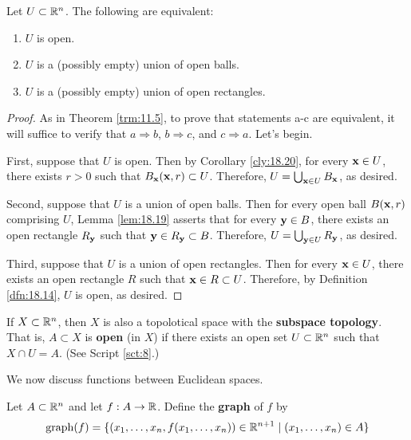 \documentclass[../main.tex]{subfiles}
\begin{document}
\begin{proposition}\label{prp:18.22}
    Let $U\subset\mathbb{R}^n$. The following are equivalent:
    \begin{enumerate}[label={\textup{(}\alph*\textup{)}}]
        \item $U$ is open.
        \item $U$ is a (possibly empty) union of open balls.
        \item $U$ is a (possibly empty) union of open rectangles.
    \end{enumerate}
    \begin{proof}
        As in Theorem \ref{trm:11.5}, to prove that statements a-c are equivalent, it will suffice to verify that $a\Rightarrow b$, $b\Rightarrow c$, and $c\Rightarrow a$. Let's begin.\par\smallskip
        First, suppose that $U$ is open. Then by Corollary \ref{cly:18.20}, for every $\mathbf{x}\in U$, there exists $r>0$ such that $B_{\mathbf{x}}(\mathbf{x},r)\subset U$. Therefore, $U=\bigcup_{\mathbf{x}\in U}B_{\mathbf{x}}$, as desired.\par
        Second, suppose that $U$ is a union of open balls. Then for every open ball $B(\mathbf{x},r)$ comprising $U$, Lemma \ref{lem:18.19} asserts that for every $\mathbf{y}\in B$, there exists an open rectangle $R_{\mathbf{y}}$ such that $\mathbf{y}\in R_{\mathbf{y}}\subset B$. Therefore, $U=\bigcup_{\mathbf{y}\in U}R_{\mathbf{y}}$, as desired.\par
        Third, suppose that $U$ is a union of open rectangles. Then for every $\mathbf{x}\in U$, there exists an open rectangle $R$ such that $\mathbf{x}\in R\subset U$. Therefore, by Definition \ref{dfn:18.14}, $U$ is open, as desired.
    \end{proof}
\end{proposition}

\begin{remark}\label{rmk:18.23}
    If $X\subset\mathbb{R}^n$, then $X$ is also a topolotical space with the \textbf{subspace topology}. That is, $A\subset X$ is \textbf{open} (in $X$) if there exists an open set $U\subset\mathbb{R}^n$ such that $X\cap U=A$. (See Script \ref{sct:8}.)
\end{remark}

We now discuss functions between Euclidean spaces.

\begin{definition}\label{dfn:18.24}
    Let $A\subset\mathbb{R}^n$ and let $f:A\to\mathbb{R}$. Define the \textbf{graph} of $f$ by
    \begin{equation*}
        \operatorname{graph}(f) = \{(x_1,\dots,x_n,f(x_1,\dots,x_n))\in\mathbb{R}^{n+1}\mid(x_1,\dots,x_n)\in A\}
    \end{equation*}
\end{definition}
\end{document}
